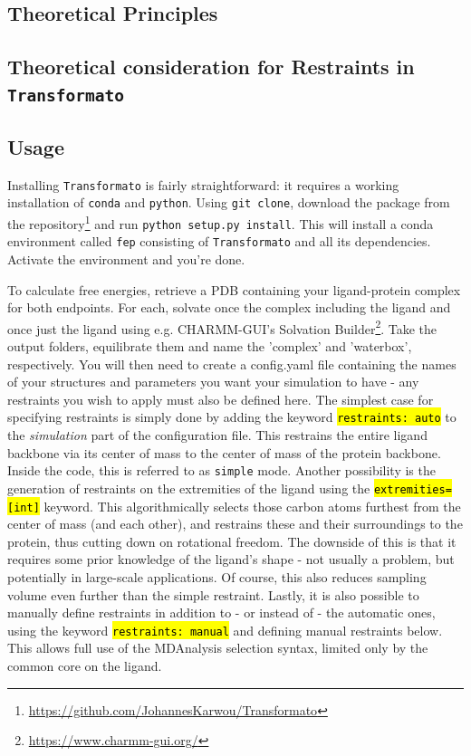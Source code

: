 \documentclass[oneside]{scrreprt}
\newcommand{\code}[1]{\texttt{\hl{#1}}}
\begin{document}
\subsection{Theoretical Principles}
\subsection{Theoretical consideration for Restraints in \texttt{Transformato}}
\subsection{Usage}
Installing \texttt{Transformato} is fairly straightforward: it requires a working installation of \texttt{conda} and \texttt{python}. Using \texttt{git clone}, download the package from the repository\footnote{\url{https://github.com/JohannesKarwou/Transformato}} and run \texttt{python setup.py install}. This will install a conda environment called \texttt{fep} consisting of \texttt{Transformato} and all its dependencies. Activate the environment and you're done.

To calculate free energies, retrieve a PDB containing your ligand-protein complex for both endpoints. For each, solvate once the complex including the ligand and once just the ligand using e.g. CHARMM-GUI's Solvation Builder\footnote{\url{https://www.charmm-gui.org/}}. Take the output folders, equilibrate them and name the 'complex' and 'waterbox', respectively. You will then need to create a config.yaml file containing the names of your structures and parameters you want your simulation to have - any restraints you wish to apply must also be defined here. The simplest case for specifying restraints is simply done by adding the keyword \code{restraints: auto} to the \emph{simulation} part of the configuration file. This restrains the entire ligand backbone via its center of mass to the center of mass of the protein backbone. Inside the code, this is referred to as \texttt{simple} mode. Another possibility is the generation of restraints on the extremities of the ligand using the \code{extremities=[int]} keyword. This algorithmically selects those carbon atoms furthest from the center of mass (and each other), and restrains these and their surroundings to the protein, thus cutting down on rotational freedom. The downside of this is that it requires some prior knowledge of the ligand's shape - not usually a problem, but potentially in large-scale applications. Of course, this also reduces sampling volume even further than the simple restraint. Lastly, it is also possible to manually define restraints in addition to - or instead of - the automatic ones, using the keyword \code{restraints: manual} and defining manual restraints below. This allows full use of the MDAnalysis\cite{agrawal2011,oliver_beckstein-proc-scipy-2016} selection syntax, limited only by the common core on the ligand.
\end{document}
